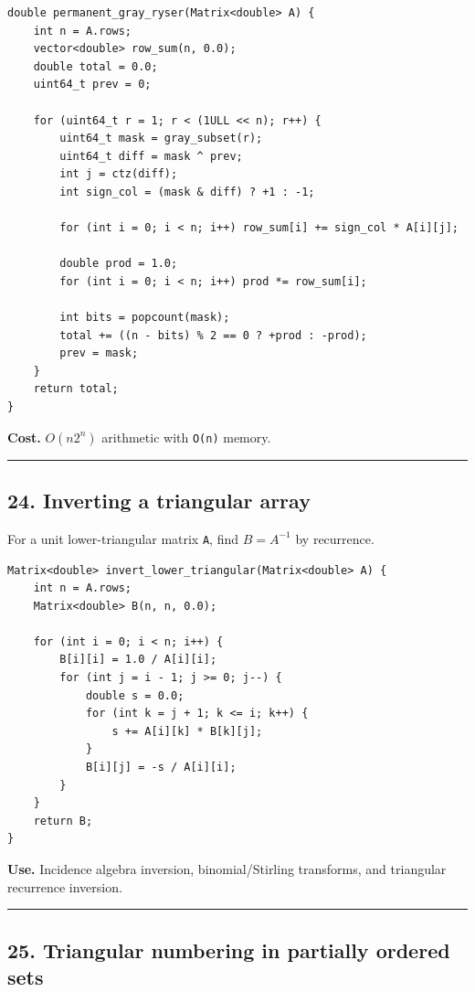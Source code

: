 \documentclass[11pt]{article}
\begin{document}
\begin{verbatim}
double permanent_gray_ryser(Matrix<double> A) {
    int n = A.rows;
    vector<double> row_sum(n, 0.0);
    double total = 0.0;
    uint64_t prev = 0;

    for (uint64_t r = 1; r < (1ULL << n); r++) {
        uint64_t mask = gray_subset(r);
        uint64_t diff = mask ^ prev;
        int j = ctz(diff);
        int sign_col = (mask & diff) ? +1 : -1;

        for (int i = 0; i < n; i++) row_sum[i] += sign_col * A[i][j];

        double prod = 1.0;
        for (int i = 0; i < n; i++) prod *= row_sum[i];

        int bits = popcount(mask);
        total += ((n - bits) % 2 == 0 ? +prod : -prod);
        prev = mask;
    }
    return total;
}
\end{verbatim}

\textbf{Cost.} \(O(n 2^n)\) arithmetic with \texttt{O(n)} memory.

\begin{center}\rule{0.5\linewidth}{0.5pt}\end{center}

\subsection{24. Inverting a triangular array}\label{inverting-a-triangular-array}

For a unit lower-triangular matrix \texttt{A}, find \(B=A^{-1}\) by recurrence.

\begin{verbatim}
Matrix<double> invert_lower_triangular(Matrix<double> A) {
    int n = A.rows;
    Matrix<double> B(n, n, 0.0);

    for (int i = 0; i < n; i++) {
        B[i][i] = 1.0 / A[i][i];
        for (int j = i - 1; j >= 0; j--) {
            double s = 0.0;
            for (int k = j + 1; k <= i; k++) {
                s += A[i][k] * B[k][j];
            }
            B[i][j] = -s / A[i][i];
        }
    }
    return B;
}
\end{verbatim}

\textbf{Use.} Incidence algebra inversion, binomial/Stirling transforms, and triangular recurrence inversion.

\begin{center}\rule{0.5\linewidth}{0.5pt}\end{center}

\subsection{25. Triangular numbering in partially ordered sets}\label{triangular-numbering-in-partially-ordered-sets}
\end{document}
